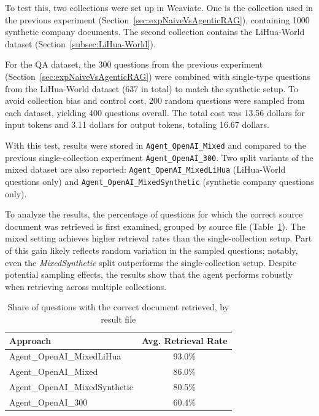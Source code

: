 To test this, two collections were set up in Weaviate. One is the collection used in the previous experiment (Section~\ref{sec:expNaiveVsAgenticRAG}), containing 1000 synthetic company documents. The second collection contains the LiHua-World dataset (Section~\ref{subsec:LiHua-World}).

For the \gls{QA} dataset, the 300 questions from the previous experiment (Section~\ref{sec:expNaiveVsAgenticRAG}) were combined with single-type questions from the LiHua-World dataset (637 in total) to match the synthetic setup. To avoid collection bias and control cost, 200 random questions were sampled from each dataset, yielding 400 questions overall. The total cost was 13.56 dollars for input tokens and 3.11 dollars for output tokens, totaling 16.67 dollars.

With this test, results were stored in \texttt{Agent\_OpenAI\_Mixed} and compared to the previous single-collection experiment \texttt{Agent\_OpenAI\_300}. Two split variants of the mixed dataset are also reported: \texttt{Agent\_OpenAI\_MixedLiHua} (LiHua-World questions only) and \texttt{Agent\_OpenAI\_MixedSynthetic} (synthetic company questions only).

To analyze the results, the percentage of questions for which the correct source document was retrieved is first examined, grouped by source file (Table~\ref{tab:doc-retrieved-by-source-mixed}). The mixed setting achieves higher retrieval rates than the single-collection setup. Part of this gain likely reflects random variation in the sampled questions; notably, even the \emph{MixedSynthetic} split outperforms the single-collection setup. Despite potential sampling effects, the results show that the agent performs robustly when retrieving across multiple collections.
\begin{table}[htbp]
    \centering
    \begin{tabular}{l c}
        \hline
        Approach & Avg. Retrieval Rate \\
        \hline
    Agent\_OpenAI\_MixedLiHua & 93.0\% \\
    Agent\_OpenAI\_Mixed & 86.0\% \\
    Agent\_OpenAI\_MixedSynthetic & 80.5\% \\
    Agent\_OpenAI\_300 & 60.4\% \\
        \hline
    \end{tabular}
    \caption{Share of questions with the correct document retrieved, by result file}\label{tab:doc-retrieved-by-source-mixed}
\end{table}

